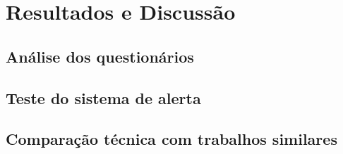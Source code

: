 \chapter{Resultados e Discussão}



\section{Análise dos questionários}\label{questionario}

\section{Teste do sistema de alerta}\label{alerta}

\section{Comparação técnica com trabalhos similares}\label{comparacao}